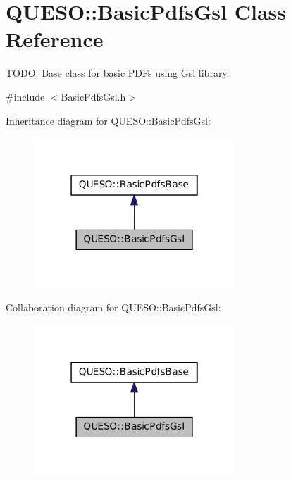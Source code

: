 \hypertarget{class_q_u_e_s_o_1_1_basic_pdfs_gsl}{\section{Q\-U\-E\-S\-O\-:\-:Basic\-Pdfs\-Gsl Class Reference}
\label{class_q_u_e_s_o_1_1_basic_pdfs_gsl}
}


T\-O\-D\-O\-: Base class for basic P\-D\-Fs using Gsl library.  




{\ttfamily \#include $<$Basic\-Pdfs\-Gsl.\-h$>$}



Inheritance diagram for Q\-U\-E\-S\-O\-:\-:Basic\-Pdfs\-Gsl\-:
\nopagebreak
\begin{figure}[H]
\begin{center}
\leavevmode
\includegraphics[width=214pt]{class_q_u_e_s_o_1_1_basic_pdfs_gsl__inherit__graph}
\end{center}
\end{figure}


Collaboration diagram for Q\-U\-E\-S\-O\-:\-:Basic\-Pdfs\-Gsl\-:
\nopagebreak
\begin{figure}[H]
\begin{center}
\leavevmode
\includegraphics[width=214pt]{class_q_u_e_s_o_1_1_basic_pdfs_gsl__coll__graph}
\end{center}
\end{figure}
